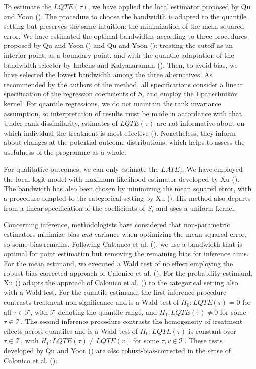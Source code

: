 \documentclass[
  11pt]{article}
\begin{document}
To estimate the \(LQTE(\tau)\), we have applied the local estimator
proposed by Qu and Yoon (). The procedure
to choose the bandwidth is adapted to the quantile setting but preserves
the same intuition: the minimization of the mean squared error. We have
estimated the optimal bandwidths according to three procedures proposed
by Qu and Yoon () and Qu and Yoon
(): treating the cutoff as an interior
point, as a boundary point, and with the quantile adaptation of the
bandwidth selector by Imbens and Kalyanaraman
(). Then, to avoid bias, we have
selected the lowest bandwidth among the three alternatives. As
recommended by the authors of the method, all specifications consider a
linear specification of the regression coefficients of \(S_i\) and
employ the Epanechnikov kernel. For quantile regressions, we do not
maintain the rank invariance assumption, so interpretation of results
must be made in accordance with that. Under rank dissimilarity,
estimates of \(LQTE(\tau)\) are not informative about on which
individual the treatment is most effective
(). Nonetheless, they
inform about changes at the potential outcome distributions, which helps
to assess the usefulness of the programme as a whole.

For qualitative outcomes, we can only estimate the \(LATE_j\). We have
employed the local logit model with maximum likelihood estimator
developed by Xu (). The bandwidth has also
been chosen by minimizing the mean squared error, with a procedure
adapted to the categorical setting by Xu ().
His method also departs from a linear specification of the coefficients
of \(S_i\) and uses a uniform kernel.

Concerning inference, methodologists have considered that non-parametric
estimators minimize bias \emph{and} variance when optimizing the mean
squared error, so some bias remains. Following Cattaneo et al.
(), we use a bandwidth that is
optimal for point estimation but removing the remaining bias for
inference aims. For the mean estimand, we executed a Wald test of no
effect employing the robust bias-corrected approach of Calonico et al.
(). For the probability estimand,
Xu () adapts the approach of Calonico et al.
() to the categorical setting also
with a Wald test. For the quantile estimand, the first inference
procedure contrasts treatment non-significance and is a Wald test of
\(H_0:LQTE(\tau)=0\) for all \(\tau \in \mathcal{T}\), with
\(\mathcal{T}\) denoting the quantile range, and
\(H_1:LQTE(\tau) \ne 0\) for some \(\tau \in \mathcal{T}\). The second
inference procedure contrasts the homogeneity of treatment effects
across quantiles and is a Wald test of \(H_0:LQTE(\tau)\) is constant
over \(\tau \in \mathcal{T}\), with \(H_1:LQTE(\tau) \ne LQTE(v)\) for
some \(\tau,v \in \mathcal{T}\). These tests developed by Qu and Yoon
() are also robust-bias-corrected in the
sense of Calonico et al. ().
\end{document}
